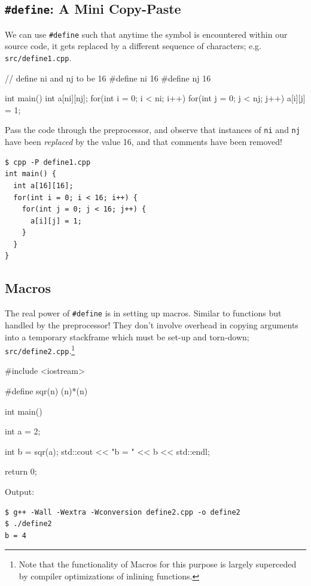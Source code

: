 \documentclass[12pt,letterpaper,twoside]{article}
\begin{document}
\subsection{\texttt{\#define}: A Mini Copy-Paste}
We can use \texttt{\#define} such that anytime the symbol is encountered within our
source code, it gets replaced by a different sequence of characters; e.g.
\texttt{src/define1.cpp}.

\begin{cpp}
// define ni and nj to be 16
#define ni 16
#define nj 16

int main() {
  int a[ni][nj];
  for(int i = 0; i < ni; i++) {
    for(int j = 0; j < nj; j++) {
      a[i][j] = 1;
    }
  }
}
\end{cpp}

Pass the code through the preprocessor, and observe that instances of \texttt{ni} and 
\texttt{nj} have been \emph{replaced} by the value 16, and that comments have been removed!

\begin{verbatim}
$ cpp -P define1.cpp
int main() {
  int a[16][16];
  for(int i = 0; i < 16; i++) {
    for(int j = 0; j < 16; j++) {
      a[i][j] = 1;
    }
  }
}
\end{verbatim}

\subsection{Macros}
The real power of \texttt{\#define} is in setting up macros.
Similar to functions but handled by the preprocessor! They don't involve overhead in
copying arguments into a temporary stackframe which must be set-up and torn-down;
\texttt{src/define2.cpp}.\footnote{Note that
the functionality of Macros for this purpose is largely superceded by compiler optimizations
of inlining functions.}

\begin{cpp}
#include <iostream>

#define sqr(n) (n)*(n)

int main() {
  int a = 2;

  int b = sqr(a);
  std::cout << "b = " << b << std::endl;

  return 0;
}
\end{cpp}

Output:

\begin{verbatim}
$ g++ -Wall -Wextra -Wconversion define2.cpp -o define2
$ ./define2
b = 4
\end{verbatim}
\end{document}
